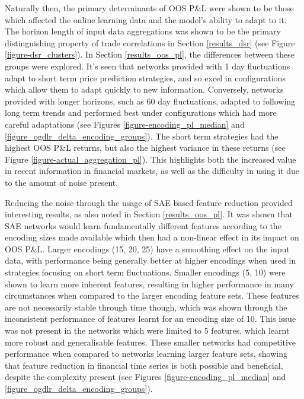\documentclass[a4paper,11pt,oneside]{article}
\theoremstyle{plain}
\theoremstyle{definition}
\begin{document}
	Naturally then, the primary determinants of OOS P\&L were shown to be those which affected the online learning data and the model's ability to adapt to it. The horizon length of input data aggregations was shown to be the primary distinguishing property of trade correlations in Section \ref{results_dsr} (see Figure \ref{figure-dsr_clusters}). In Section \ref{results_oos_pl}, the differences between these groups were explored. It's seen that networks provided with 1 day fluctuations adapt to short term price prediction strategies, and so excel in configurations which allow them to adapt quickly to new information. Conversely, networks provided with longer horizons, such as 60 day fluctuations, adapted to following long term trends and performed best under configurations which had more careful adaptations (see Figures \ref{figure-encoding_pl_median} and \ref{figure_ogdlr_delta_encoding_groups}). The short term strategies had the highest OOS P\&L returns, but also the highest variance in these returns (see Figure \ref{figure-actual_aggregation_pl}). This highlights both the increased value in recent information in financial markets, as well as the difficulty in using it due to the amount of noise present.\newline 
	
	Reducing the noise through the usage of SAE based feature reduction provided interesting results, as also noted in Section \ref{results_oos_pl}. It was shown that SAE networks would learn fundamentally different features according to the encoding sizes made available which then had a non-linear effect in its impact on OOS P\&L. Larger encodings (15, 20, 25) have a smoothing effect on the input data, with performance being generally better at higher encodings when used in strategies focusing on short term fluctuations. Smaller encodings (5, 10) were shown to learn more inherent features, resulting in higher performance in many circumstances when compared to the larger encoding feature sets. These features are not necessarily stable through time though, which was shown through the inconsistent performance of features learnt for an encoding size of 10. This issue was not present in the networks which were limited to 5 features, which learnt more robust and generalisable features. These smaller networks had competitive performance when compared to networks learning larger feature sets, showing that feature reduction in financial time series is both possible and beneficial, despite the complexity present (see Figures \ref{figure-encoding_pl_median} and \ref{figure_ogdlr_delta_encoding_groups}). \newline	
	
\end{document}
